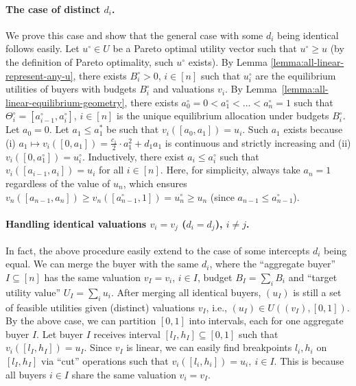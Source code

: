 	\paragraph{The case of distinct $d_i$.} 
	We prove this case and show that the general case with some $d_i$ being identical follows easily.
	Let $u^\circ \in  U$ be a Pareto optimal utility vector such that $u^\circ \geq u$ (by the definition of Pareto optimality, such $u^\circ$ exists). 
	By Lemma \ref{lemma:all-linear-represent-any-u}, there exists $B^\circ_i > 0$, $i\in [n]$ such that $u^\circ_i$ are the equilibrium utilities of buyers with budgets $B^\circ_i$ and valuations $v_i$. By Lemma~\ref{lemma:all-linear-equilibrium-geometry}, there exists 
	$a^\circ_0 = 0 < a^\circ_1 < \dots < a^\circ_n = 1$
	such that $\Theta^\circ_i = [a^\circ_{i-1}, a^\circ_i]$, $i\in [n]$ is the unique equilibrium allocation under budgets $B^\circ_i$. Let $a_0 = 0$. Let $a_1 \leq a^*_1$ be such that $v_i( [a_0, a_1] ) = u_i$. Such $a_1$ exists because (i) $a_1 \mapsto v_i([0, a_1]) = \frac{c_1}{2}\cdot a_1^2 + d_1 a_1$ is continuous and strictly increasing and (ii) $ v_i([0, a^\circ_1]) = u^\circ_i$. Inductively, there exist $a_i\leq a^\circ_i$ such that $v_i([a_{i-1}, a_i]) = u_i$ for all $i\in [n]$. Here, for simplicity, always take $a_n = 1$ regardless of the value of $u_n$, which ensures $v_n([a_{n-1}, a_n]) \geq v_n([a^\circ_{n-1}, 1]) = u^\circ_n \geq u_n$ (since $a_{n-1}\leq a^\circ_{n-1}$). 
	
	\paragraph{Handling identical valuations $v_i = v_j$ ($d_i = d_j$), $i\neq j$.} 
	In fact, the above procedure easily extend to the case of some intercepts $d_i$ being equal. We can merge the buyer with the same $d_i$, where the ``aggregate buyer'' $I\subseteq [n]$ has the same valuation $v_I = v_i$, $i\in I$, budget $B_I = \sum_i B_i$ and ``target utility value'' $U_I = \sum_i u_i$. After merging all identical buyers, $(u_I)$ is still a set of feasible utilities given (distinct) valuations $v_I$, i.e., $ (u_I) \in U((v_I), [0,1])$. By the above case, we can partition $[0,1]$ into intervals, each for one aggregate buyer $I$.
	Let buyer $I$ receives interval $[l_I, h_I]\subseteq [0,1]$ such that $v_i([l_I, h_I]) = u_I$. Since $v_I$ is linear, we can easily find breakpoints $l_i, h_i$ on $[l_I, h_I]$ via ``cut'' operations such that
	$ v_i([l_i, h_i]) = u_i,\ i\in I$.
	This is because all buyers $i\in I$ share the same valuation $v_i = v_I$.
	
